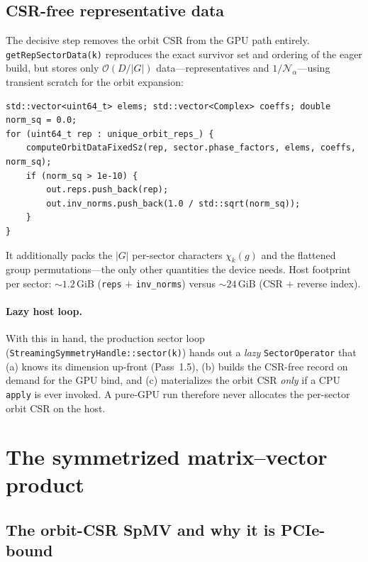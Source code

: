 \documentclass[11pt]{article}
\newcommand{\bigO}{\mathcal{O}}
\newcommand{\Norm}{\mathcal{N}}
\newcommand{\code}[1]{\texttt{\small #1}}
\begin{document}
\subsection{CSR-free representative data}
\label{sec:repdata}

The decisive step removes the orbit CSR from the GPU path entirely.
\code{getRepSectorData(k)} reproduces the exact survivor set and ordering of the
eager build, but stores only $\bigO(D/|G|)$ data---representatives and
$1/\Norm_\alpha$---using transient scratch for the orbit expansion:

\begin{lstlisting}[caption={CSR-free per-sector source. \code{streaming\_symmetry.h}}]
std::vector<uint64_t> elems; std::vector<Complex> coeffs; double norm_sq = 0.0;
for (uint64_t rep : unique_orbit_reps_) {
    computeOrbitDataFixedSz(rep, sector.phase_factors, elems, coeffs, norm_sq);
    if (norm_sq > 1e-10) {
        out.reps.push_back(rep);
        out.inv_norms.push_back(1.0 / std::sqrt(norm_sq));
    }
}
\end{lstlisting}

It additionally packs the $|G|$ per-sector characters $\chi_k(g)$ and the
flattened group permutations---the only other quantities the device needs. Host
footprint per sector: ${\sim}1.2$\,GiB (\code{reps} $+$ \code{inv\_norms}) versus
${\sim}24$\,GiB (CSR $+$ reverse index).

\paragraph{Lazy host loop.} With this in hand, the production sector loop
(\code{StreamingSymmetryHandle::sector(k)}) hands out a \emph{lazy}
\code{SectorOperator} that (a) knows its dimension up-front (Pass~1.5),
(b) builds the CSR-free record on demand for the GPU bind, and (c) materializes
the orbit CSR \emph{only} if a CPU \code{apply} is ever invoked. A pure-GPU run
therefore never allocates the per-sector orbit CSR on the host.

\section{The symmetrized matrix--vector product}

\subsection{The orbit-CSR SpMV and why it is PCIe-bound}
\end{document}
